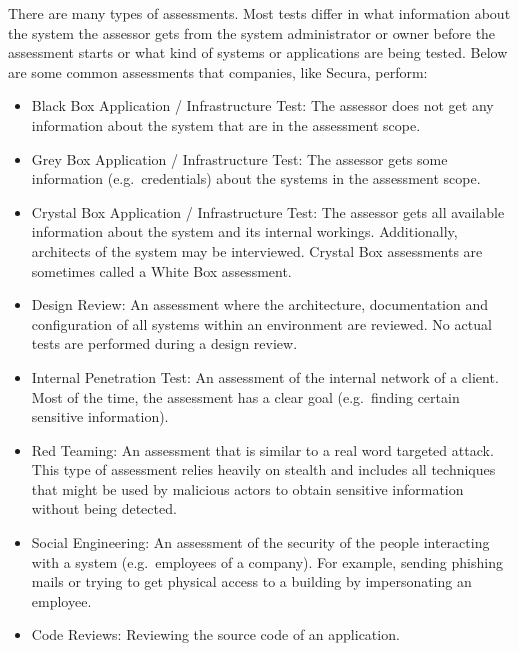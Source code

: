 There are many types of assessments. Most tests differ in what information about the system the assessor gets from the system administrator or owner before the assessment starts or what kind of systems or applications are being tested. Below are some common assessments that companies, like Secura, perform:
\begin{itemize}
    \item Black Box Application / Infrastructure Test: The assessor does not get any information about the system that are in the assessment scope.

    \item Grey Box Application / Infrastructure Test: The assessor gets some information (e.g.\ credentials) about the systems in the assessment scope.

    \item Crystal Box Application / Infrastructure Test:  The assessor gets all available information about the system and its internal workings. Additionally, architects of the system may be interviewed. Crystal Box assessments are sometimes called a White Box assessment.

    \item Design Review: An assessment where the architecture, documentation and configuration of all systems within an environment are reviewed. No actual tests are performed during a design review.
    \item Internal Penetration Test: An assessment of the internal network of a client. Most of the time, the assessment has a clear goal (e.g.\ finding certain sensitive information).

    \item Red Teaming: An assessment that is similar to a real word targeted attack. This type of assessment relies heavily on stealth and includes all techniques that might be used by malicious actors to obtain sensitive information without being detected.

    \item Social Engineering: An assessment of the security of the people interacting with a system (e.g.\ employees of a company). For example, sending phishing mails or trying to get physical access to a building by impersonating an employee.

    \item Code Reviews: Reviewing the source code of an application.
\end{itemize}
